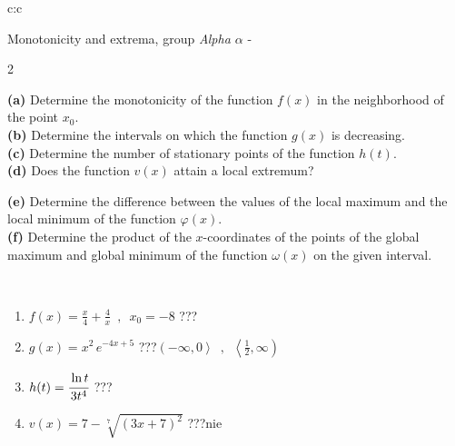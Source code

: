 \documentclass[10pt]{report}
\begin{document}
\thispagestyle{empty}
\begin{tabular}{c:c}
\begin{minipage}[c][104.5mm][t]{0.5\linewidth}
\begin{center}
\vspace{5mm}
{\huge Monotonicity and extrema, group \textit{Alpha $\alpha$} -}\\[5mm]
\begin{minipage}{0.95\linewidth}
\begin{center}
{\small \begin{multicols}{2} \raggedright
\textbf{(a)} Determine the monotonicity of the function \(f(x)\) in the neighborhood of the point \(x_0\). \\[1mm]
\textbf{(b)} Determine the intervals on which the function \(g(x)\) is decreasing. \\[1mm]
\textbf{(c)} Determine the number of stationary points of the function \(h(t)\). \\[1mm]
\textbf{(d)} Does the function \(v(x)\) attain a local extremum? \par \columnbreak
\textbf{(e)} Determine the difference between the values of the local maximum and the local minimum of the function \(\varphi(x)\). \\[1mm]
\textbf{(f)} Determine the product of the \(x\)-coordinates of the points of the global maximum and global minimum of the function \(\omega(x)\) on the given interval. \\[1mm]
\end{multicols}
}
\end{center}
\end{minipage}
\\[1mm]
\begin{minipage}{0.79\linewidth}
\begin{center}
\begin{varwidth}{\linewidth}
\setlength{\itemsep}{0pt}
\begin{enumerate}
\normalsize
\item $f(x)=\frac{x}{4}+\frac{4}{x} \enspace , \enspace x_0=-8$\quad \dotfill\; ???\;\dotfill \quad {}
\item $g(x)=x^2\, e^{-4x+5}$\quad \dotfill\; ???\;\dotfill \quad $\left(-\infty , 0\right\rangle\enspace , \enspace \left\langle\frac{1}{2} , \infty\right)$
\item $h(t)=\cfrac{\ln t}{3t^4}$\quad \dotfill\; ???\;\dotfill {}
\item $v(x)=7-\sqrt[7]{(3x+7)^2}$\quad \dotfill\; ???\;\dotfill \quad $\text{nie}$

\end{enumerate}
\end{varwidth}
\end{center}
\end{minipage}
\end{center}
\end{minipage}
\end{tabular}
\end{document}
